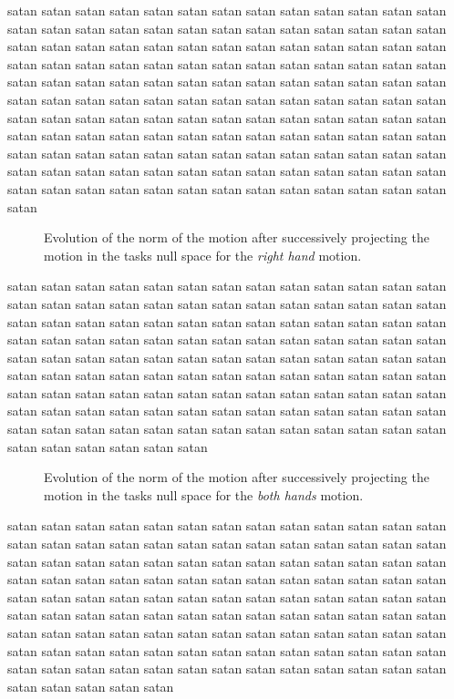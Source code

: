 \documentclass[letterpaper, 10pt, conference]{ieeeconf}      %
\begin{document}
satan
satan satan satan satan satan satan satan satan satan satan satan
satan satan satan satan satan satan satan satan satan satan satan
satan satan satan satan satan satan satan satan satan satan satan
satan satan satan satan satan satan satan satan satan satan satan
satan satan satan satan satan satan satan satan satan satan satan
satan satan satan satan satan satan satan satan satan satan satan
satan satan satan satan satan satan satan satan satan satan satan
satan satan satan satan satan satan satan satan satan satan satan
satan satan satan satan satan satan satan satan satan satan satan
satan satan satan satan satan satan satan satan satan satan satan
satan satan satan satan satan satan satan satan satan satan satan
satan satan satan satan satan satan satan satan satan satan satan
satan satan satan satan satan satan satan satan satan satan satan

\begin{figure}[t]

\caption{Evolution of the norm of the motion after successively projecting the motion in the tasks null space for
the \emph{right hand} motion.}
\label{fig:exp1:PqdotNormsR}
\end{figure}

satan
satan satan satan satan satan satan satan satan satan satan satan
satan satan satan satan satan satan satan satan satan satan satan
satan satan satan satan satan satan satan satan satan satan satan
satan satan satan satan satan satan satan satan satan satan satan
satan satan satan satan satan satan satan satan satan satan satan
satan satan satan satan satan satan satan satan satan satan satan
satan satan satan satan satan satan satan satan satan satan satan
satan satan satan satan satan satan satan satan satan satan satan
satan satan satan satan satan satan satan satan satan satan satan
satan satan satan satan satan satan satan satan satan satan satan
satan satan satan satan satan satan satan satan satan satan satan
satan

\begin{figure}[t]

\caption{Evolution of the norm of the motion after successively projecting the motion in the tasks null space for
the \emph{both hands} motion.}
\label{fig:exp1:PqdotNormsRL}
\end{figure}

satan satan satan satan satan satan satan satan satan satan satan
satan satan satan satan satan satan satan satan satan satan satan
satan satan satan satan satan satan satan satan satan satan satan
satan satan satan satan satan satan satan satan satan satan satan
satan satan satan satan satan satan satan satan satan satan satan
satan satan satan satan satan satan satan satan satan satan satan
satan satan satan satan satan satan satan satan satan satan satan
satan satan satan satan satan satan satan satan satan satan satan
satan satan satan satan satan satan satan satan satan satan satan
satan satan satan satan satan satan satan satan satan satan satan
satan satan satan satan satan satan satan satan satan satan satan
satan



\end{document}
